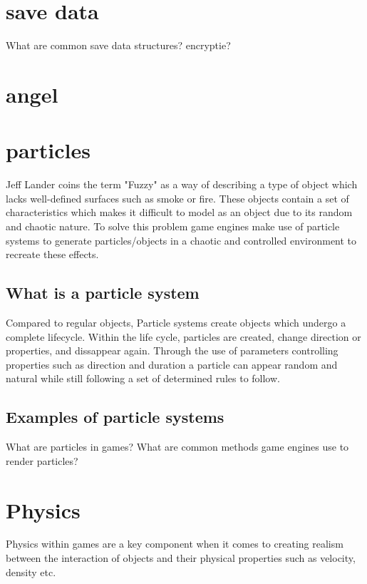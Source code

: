 \documentclass{article} %
\begin{document}
\section{save data}
What are common save data structures?
encryptie? 
\newpage

\section{angel}
\section{particles}

Jeff Lander coins the term "Fuzzy" as a way of describing a type of object which lacks well-defined surfaces such as smoke or fire. \cite{Lander_1998} These objects contain a set of characteristics which makes it difficult to model as an object due to its random and chaotic nature. To solve this problem game engines make use of particle systems to generate particles/objects in a chaotic and controlled environment to recreate these effects.

\subsection{What is a particle system}

Compared to regular objects, Particle systems create objects which undergo a complete lifecycle. Within the life cycle, particles are created, change direction or properties, and dissappear again. Through the use of parameters controlling properties such as direction and duration a particle can appear random and natural while still following a set of determined rules to follow.

\subsection{Examples of particle systems}



What are particles in games?
What are common methods game engines use to render particles?

\newpage

\section{Physics}

Physics within games are a key component when it comes to creating realism between the interaction of objects and their physical properties such as velocity, density etc. 
\end{document}
